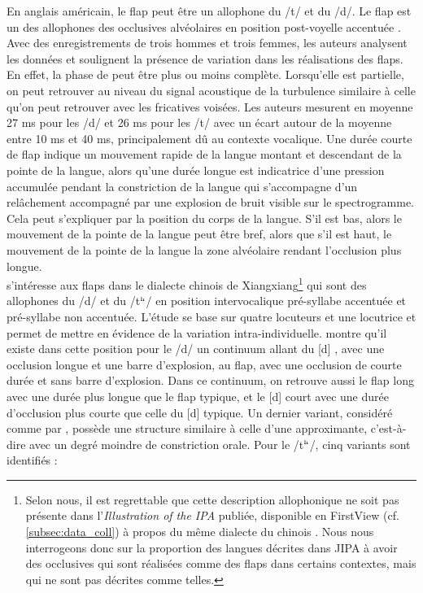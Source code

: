 En anglais américain, le flap peut être un allophone du /t/ et du /d/. Le flap est un des allophones des occlusives alvéolaires en position post-voyelle accentuée \parencite{zueAcousticStudyMedial1979}.
Avec des enregistrements de trois hommes et trois femmes, les auteurs analysent les données et soulignent la présence de variation dans les réalisations des flaps. En effet, la phase de  peut être plus ou moins complète. Lorsqu'elle est partielle, on peut retrouver au niveau du signal acoustique de la turbulence similaire à celle qu'on peut retrouver avec les fricatives voisées. Les auteurs mesurent en moyenne 27 ms pour les /d/ et 26 ms pour les /t/ avec un écart autour de la moyenne entre 10 ms et 40 ms, principalement dû au contexte vocalique. Une durée courte de flap indique un mouvement rapide de la langue montant et descendant de la pointe de la langue, alors qu'une durée longue est indicatrice d'une pression accumulée pendant la constriction de la langue qui s'accompagne d'un relâchement accompagné par une explosion de bruit visible sur le spectrogramme. Cela peut s'expliquer par la position du corps de la langue. S'il est bas, alors le mouvement de la pointe de la langue peut être bref, alors que s'il est haut, le mouvement de la pointe de la langue  la zone alvéolaire rendant l'occlusion plus longue.\\


\textcite{zengUnderstandingFlappingXiangxiang2007} s'intéresse aux flaps dans le dialecte chinois de Xiangxiang\footnote{Selon nous, il est regrettable que cette description allophonique ne soit pas présente dans l'\textit{Illustration of the IPA} publiée, disponible en FirstView (cf. \autoref{subsec:data_coll}) à propos du même dialecte du chinois \parencite{zengXiangxiangDialectChinese2020}. Nous nous interrogeons donc sur la proportion des langues décrites dans JIPA à avoir des occlusives qui sont réalisées comme des flaps dans certains contextes, mais qui ne sont pas décrites comme telles.} qui sont des allophones du /d/ et du /t$^\textrm{\tiny h}$/ en position intervocalique pré-syllabe accentuée et pré-syllabe non accentuée. L'étude se base sur quatre locuteurs et une locutrice et permet de mettre en évidence de la variation intra-individuelle. \citeauthor{zengUnderstandingFlappingXiangxiang2007} montre qu'il existe dans cette position pour le /d/ un continuum allant du [d] , avec une occlusion longue et une barre d'explosion, au flap, avec une occlusion de courte durée et sans barre d'explosion. Dans ce continuum, on retrouve aussi le flap long avec une durée plus longue que le flap typique, et le [d] court avec une durée d'occlusion plus courte que celle du [d] typique.
Un dernier variant, considéré comme  par \citeauthor{zengUnderstandingFlappingXiangxiang2007}, possède une structure similaire à celle d'une approximante, c'est-à-dire avec un degré moindre de constriction orale. Pour le /t$^\textrm{\tiny h}$/, cinq variants sont identifiés :

